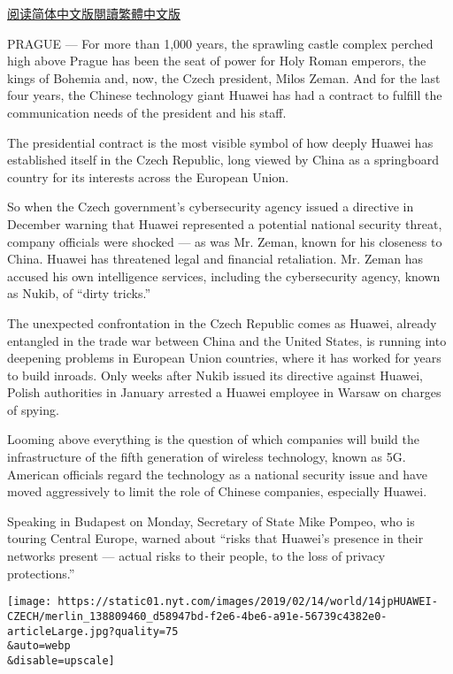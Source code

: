 \href{https://cn.nytimes.com/world/20190213/czech-republic-huawei/}{阅读简体中文版}\href{https://cn.nytimes.com/world/20190213/czech-republic-huawei/zh-hant/}{閱讀繁體中文版}

PRAGUE --- For more than 1,000 years, the sprawling castle complex
perched high above Prague has been the seat of power for Holy Roman
emperors, the kings of Bohemia and, now, the Czech president, Milos
Zeman. And for the last four years, the Chinese technology giant Huawei
has had a contract to fulfill the communication needs of the president
and his staff.

The presidential contract is the most visible symbol of how deeply
Huawei has established itself in the Czech Republic, long viewed by
China as a springboard country for its interests across the European
Union.

So when the Czech government's cybersecurity agency issued a directive
in December warning that Huawei represented a potential national
security threat, company officials were shocked --- as was Mr. Zeman,
known for his closeness to China. Huawei has threatened legal and
financial retaliation. Mr. Zeman has accused his own intelligence
services, including the cybersecurity agency, known as Nukib, of ``dirty
tricks.''

The unexpected confrontation in the Czech Republic comes as Huawei,
already entangled in the trade war between China and the United States,
is running into deepening problems in European Union countries, where it
has worked for years to build inroads. Only weeks after Nukib issued its
directive against Huawei, Polish authorities in January arrested a
Huawei employee in Warsaw on charges of spying.

Looming above everything is the question of which companies will build
the infrastructure of the fifth generation of wireless technology, known
as 5G. American officials regard the technology as a national security
issue and have moved aggressively to limit the role of Chinese
companies, especially Huawei.

Speaking in Budapest on Monday, Secretary of State Mike Pompeo, who is
touring Central Europe, warned about ``risks that Huawei's presence in
their networks present --- actual risks to their people, to the loss of
privacy protections.''

\texttt{[image: https://static01.nyt.com/images/2019/02/14/world/14jpHUAWEI-CZECH/merlin\_138809460\_d58947bd-f2e6-4be6-a91e-56739c4382e0-articleLarge.jpg?quality=75\\\&auto=webp\\\&disable=upscale]}

